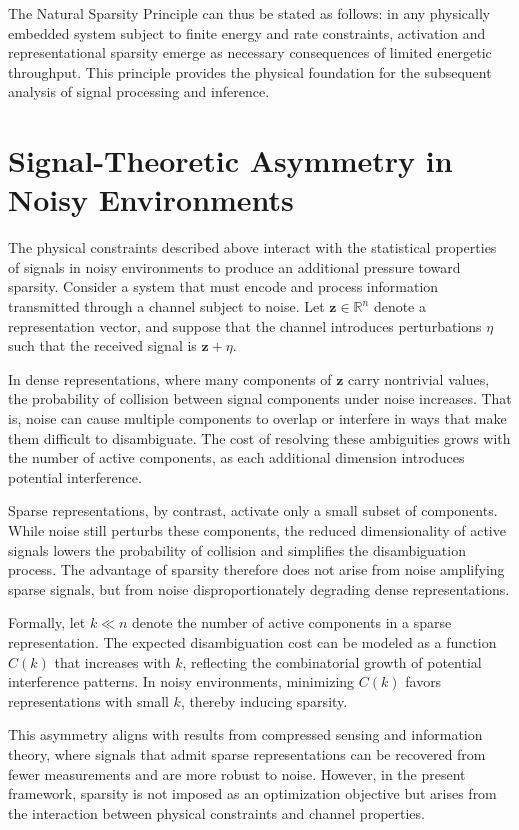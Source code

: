 \documentclass[12pt]{article}
\theoremstyle{plain}
\theoremstyle{definition}
\theoremstyle{remark}
\begin{document}
The Natural Sparsity Principle can thus be stated as follows: in any physically embedded system subject to finite energy and rate constraints, activation and representational sparsity emerge as necessary consequences of limited energetic throughput. This principle provides the physical foundation for the subsequent analysis of signal processing and inference.

\section{Signal-Theoretic Asymmetry in Noisy Environments}

The physical constraints described above interact with the statistical properties of signals in noisy environments to produce an additional pressure toward sparsity. Consider a system that must encode and process information transmitted through a channel subject to noise. Let $\mathbf{z} \in \mathbb{R}^n$ denote a representation vector, and suppose that the channel introduces perturbations $\eta$ such that the received signal is $\mathbf{z} + \eta$.

In dense representations, where many components of $\mathbf{z}$ carry nontrivial values, the probability of collision between signal components under noise increases. That is, noise can cause multiple components to overlap or interfere in ways that make them difficult to disambiguate. The cost of resolving these ambiguities grows with the number of active components, as each additional dimension introduces potential interference.

Sparse representations, by contrast, activate only a small subset of components. While noise still perturbs these components, the reduced dimensionality of active signals lowers the probability of collision and simplifies the disambiguation process. The advantage of sparsity therefore does not arise from noise amplifying sparse signals, but from noise disproportionately degrading dense representations.

Formally, let $k \ll n$ denote the number of active components in a sparse representation. The expected disambiguation cost can be modeled as a function $C(k)$ that increases with $k$, reflecting the combinatorial growth of potential interference patterns. In noisy environments, minimizing $C(k)$ favors representations with small $k$, thereby inducing sparsity.

This asymmetry aligns with results from compressed sensing and information theory, where signals that admit sparse representations can be recovered from fewer measurements and are more robust to noise. However, in the present framework, sparsity is not imposed as an optimization objective but arises from the interaction between physical constraints and channel properties.
\end{document}
